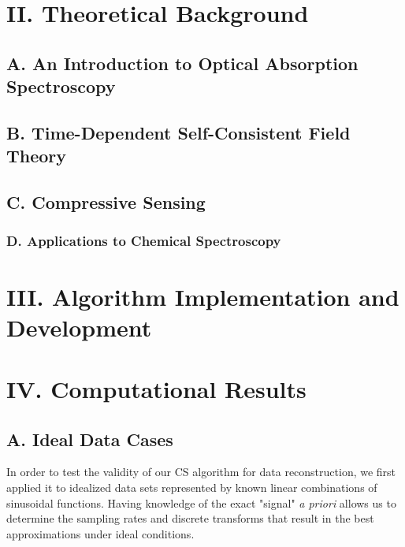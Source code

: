 \documentclass[11pt]{article}
\begin{document}

\section*{II.	Theoretical Background}	%
\subsection*{A.	An Introduction to Optical Absorption Spectroscopy} %

\subsection*{B.	Time-Dependent Self-Consistent Field Theory} %

\subsection*{C.	Compressive Sensing}	%

\subsubsection*{D.	Applications to Chemical Spectroscopy}	%




\section*{III.	Algorithm Implementation and Development}




\section*{IV.	Computational Results} %


\subsection*{A.	Ideal Data Cases}
In order to test the validity of our CS algorithm for data reconstruction, we first applied it to idealized data sets represented by known linear combinations of sinusoidal functions. Having knowledge of the exact "signal" \emph{a priori} allows us to determine the sampling rates and discrete transforms that result in the best approximations under ideal conditions. 
\end{document}

